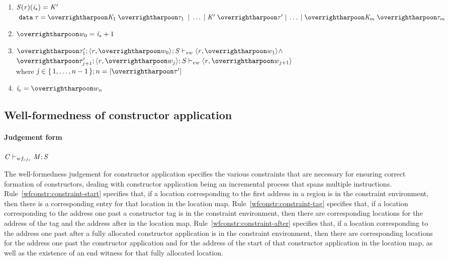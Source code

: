 \documentclass[showabstract,showacknowledgments,showpreface,showdedication]{iuphd}
\theoremstyle{nonumberplain}
\begin{document}
\begin{enumerate}
\item \label{ewitness:impl1} $\mathit{S}(\mathit{r})(\mathit{i}_s) = \mathit{K}'$ \;  \\
      $\; \DATA\;\TYP = \overharpoon{\DC_1 \; \overharpoon{\sTYP}_1\;} \; | \; \ldots \; | \; \DC' \; \overharpoon{\sTYP}' \; | \; \ldots \; | \; \overharpoon{\DC_m \; \overharpoon{\sTYP}_m\;}$

\item \label{ewitness:impl4} $\overharpoon{w_0} = \ind_s + 1$

\item \label{ewitness:impl2}
  $\ewitness{\overharpoon{\TYP'_1}}{\concreteloc{\reg}{\overharpoon{w_0}}{}}{\STOR}{\concreteloc{\reg}{\overharpoon{w_1}}{}} \wedge$ \\
  $\ewitness{\overharpoon{\TYP'_{j+1}}}{\concreteloc{\reg}{\overharpoon{w_j}}{}}{\STOR}{\concreteloc{\reg}{\overharpoon{w_{j+1}}}{}}$
  \\ where $\indj \in \set{1,\ldots,n-1} ; n = | \overharpoon{\TYP'} |$

\item \label{ewitness:impl3}
  $\ind_e = \overharpoon{w_n}$
\end{enumerate}

\subsection{Well-formedness of constructor application}
\label{sec:well-formedness-constructors}

\paragraph{Judgement form}

$\mathit{C} \vdash_{wf_{cfc}} \mathit{M};\mathit{S}$

The well-formedness judgement for constructor application specifies the various constraints
that are necessary for ensuring correct formation of constructors, dealing with constructor
application being an incremental process that spans multiple \ourcalc{} instructions.
%
Rule~\ref{wfconstr:constraint-start} specifies that, if a location corresponding to the
first address in a region is in the constraint environment, then there is a corresponding
entry for that location in the location map.
%
Rule~\ref{wfconstr:constraint-tag} specifies that, if a location corresponding to the address one past a constructor
tag is in the constraint environment, then there are corresponding locations for the address
of the tag and the address after in the location map.
%
Rule~\ref{wfconstr:constraint-after} specifies that, if a location corresponding to the address
one past after a fully allocated constructor application is in the constraint environment,
then there are corresponding locations for the address one past the constructor application
and for the address of the start of that constructor application in the location map, as well as the existence
of an end witness for that fully allocated location.
\end{document}
